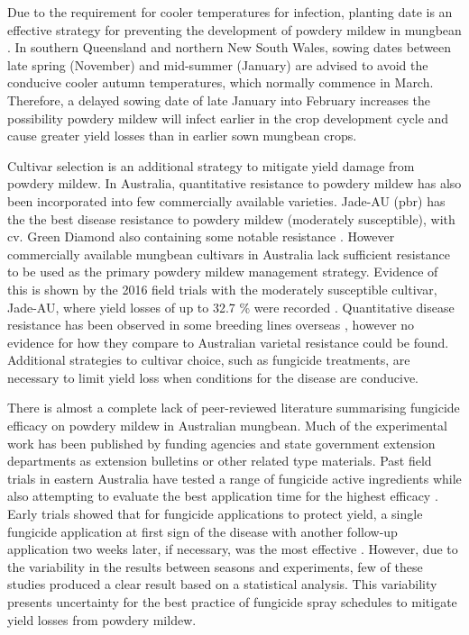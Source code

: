 \documentclass[agronomy,article,submit,moreauthors,pdftex]{mdpi}
\begin{document}
Due to the requirement for cooler temperatures for infection, planting
date is an effective strategy for preventing the development of powdery
mildew in mungbean \citep{AMAplanting}. In southern Queensland and
northern New South Wales, sowing dates between late spring (November)
and mid-summer (January) are advised to avoid the conducive cooler
autumn temperatures, which normally commence in March. Therefore, a
delayed sowing date of late January into February increases the
possibility powdery mildew will infect earlier in the crop development
cycle and cause greater yield losses than in earlier sown mungbean
crops.

Cultivar selection is an additional strategy to mitigate yield damage
from powdery mildew. In Australia, quantitative resistance to powdery
mildew has also been incorporated into few commercially available
varieties. Jade-AU {(pbr)} has the the best disease resistance to
powdery mildew (moderately susceptible), with cv. Green Diamond also
containing some notable resistance \citep{Sparks2017}. However
commercially available mungbean cultivars in Australia lack sufficient
resistance to be used as the primary powdery mildew management strategy.
Evidence of this is shown by the 2016 field trials with the moderately
susceptible cultivar, Jade-AU, where yield losses of up to 32.7 \% were
recorded \citep{SueThompson2016}. Quantitative disease resistance has
been observed in some breeding lines overseas
\citep{Pandey2018, Chankaew2013}, however no evidence for how they
compare to Australian varietal resistance could be found. Additional
strategies to cultivar choice, such as fungicide treatments, are
necessary to limit yield loss when conditions for the disease are
conducive.

There is almost a complete lack of peer-reviewed literature summarising
fungicide efficacy on powdery mildew in Australian mungbean. Much of the
experimental work has been published by funding agencies and state
government extension departments as extension bulletins or other related
type materials. Past field trials in eastern Australia have tested a
range of fungicide active ingredients while also attempting to evaluate
the best application time for the highest efficacy
\citep{goolhi2013, premer2013, Millmerran2013, Marysmount2013, SueThompson2016, Kelly2017a, Thompson2016}.
Early trials showed that for fungicide applications to protect yield, a
single fungicide application at first sign of the disease with another
follow-up application two weeks later, if necessary, was the most
effective \citep{SueThompson2016, Sparks2017}. However, due to the
variability in the results between seasons and experiments, few of these
studies produced a clear result based on a statistical analysis. This
variability presents uncertainty for the best practice of fungicide
spray schedules to mitigate yield losses from powdery mildew.
\end{document}

